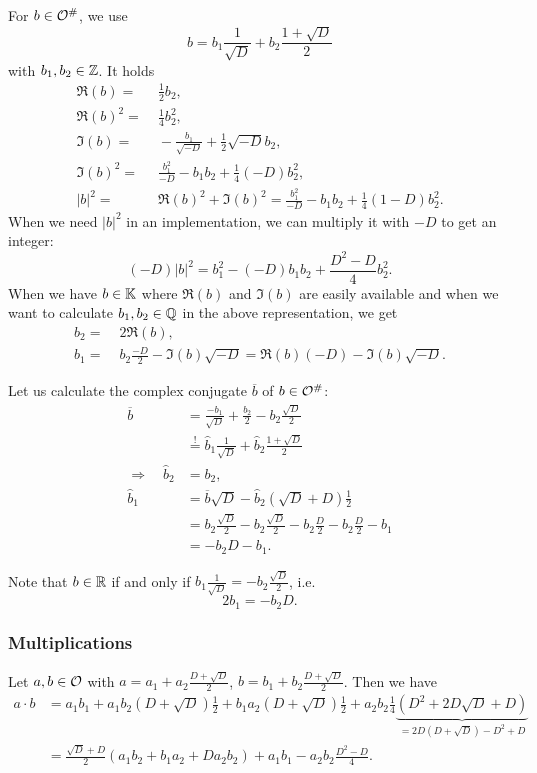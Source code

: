 For $b \in \mathcal{O}^\#$, we use
\[ b = b_1 \frac{1}{\sqrt{D}} + b_2 \frac{1 + \sqrt{D}} {2} \]
with $b_1,b_2 \in \mathbb{Z}$.
It holds
\begin{align*}
\Re(b) = &\; \frac{1}{2} b_2, \\
\Re(b)^2 = &\; \frac{1}{4} b_2^2, \\
\Im(b) = &\; -\frac{b_1}{\sqrt{-D}} + \frac{1}{2} \sqrt{-D} b_2, \\
\Im(b)^2 = &\; \frac{b_1^2}{-D} - b_1 b_2 + \frac{1}{4} (-D) b_2^2, \\
|b|^2 = &\; \Re(b)^2 + \Im(b)^2 = \frac{b_1^2}{-D} - b_1 b_2 + \frac{1}{4} (1-D) b_2^2 .
\end{align*}
When we need $|b|^2$ in an implementation, we can multiply it with $-D$ to get an integer:
\[ (-D) |b|^2 = b_1^2 - (-D) b_1 b_2 + \frac{D^2-D}{4} b_2^2 . \]
%
When we have $b \in \mathbb{K}$ where $\Re(b)$ and $\Im(b)$ are easily available and when we want to calculate $b_1,b_2 \in \mathbb{Q}$ in the above representation, we get
\begin{align*}
b_2 =&\; 2 \Re(b) , \\
b_1 =&\; b_2 \frac{-D}{2} - \Im(b) \sqrt{-D} = \Re(b) (-D) - \Im(b) \sqrt{-D} .
\end{align*}

Let us calculate the complex conjugate $\overline{b}$ of $b \in \mathcal{O}^\#$:
\begin{align*}
\overline{b} &= \frac{-b_1}{\sqrt{D}} + \frac{b_2}{2} - b_2 \frac{\sqrt{D}}{2} \\
&\overset{!}{=} \hat{b}_1 \frac{1}{\sqrt{D}} + \hat{b}_2 \frac{1 + \sqrt{D}} {2} \\
\Rightarrow \quad \hat{b}_2 &= b_2 , \\
\hat{b}_1 &= \overline{b} \sqrt{D} - \hat{b}_2 (\sqrt{D}+D) \tfrac{1}{2} \\
&= b_2 \frac{\sqrt{D}}{2} - b_2 \frac{\sqrt{D}}{2} - b_2 \frac{D}{2} - b_2 \frac{D}{2} - b_1 \\
&= -b_2 D - b_1 .
\end{align*}

Note that $b \in \mathbb{R}$ if and only if $b_1 \frac{1}{\sqrt{D}} = - b_2 \frac{\sqrt{D}}{2}$, i.e.
\[ 2 b_1 = - b_2 D . \]

\subsubsection{Multiplications}
\label{curlOmultiplications}
Let $a,b \in \mathcal{O}$ with $a = a_1 + a_2 \frac{D + \sqrt{D}} {2}$, $b = b_1 + b_2 \frac{D + \sqrt{D}} {2}$. Then we have
\begin{align*}
a \cdot b &= a_1 b_1 + a_1 b_2 (D + \sqrt{D}) \tfrac{1}{2} + b_1 a_2 (D + \sqrt{D}) \tfrac{1}{2}
+ a_2 b_2 \tfrac{1}{4} \underbrace{(D^2 + 2 D \sqrt{D} + D)}_{= 2D (D + \sqrt{D}) - D^2 + D} \\
&= \frac{\sqrt{D} + D}{2} (a_1 b_2 + b_1 a_2 + D a_2 b_2)
+ a_1 b_1 - a_2 b_2 \frac{D^2 - D}{4} .
\end{align*}

